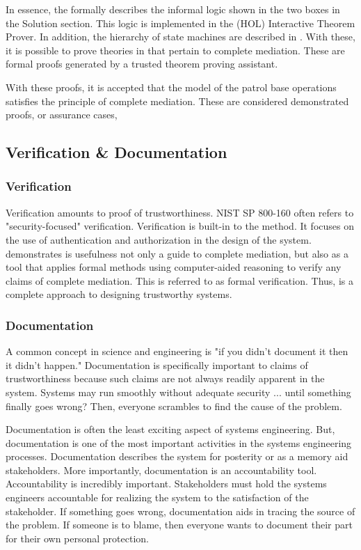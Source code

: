 \documentclass[../../main/main.tex]{subfiles}
\begin{document}
In essence, the  formally describes the informal logic shown in the two boxes in the Solution section.  This logic is implemented in the  (HOL) Interactive Theorem Prover.  In addition, the hierarchy of state machines are described in .  With these, it is possible to prove theories in  that pertain to complete mediation.  These are formal proofs generated by a trusted theorem proving assistant.  

With these proofs, it is accepted that the model of the patrol base operations satisfies the principle of complete mediation.  These are considered demonstrated proofs, or assurance cases, 

\subsection{Verification \& Documentation}\label{sssec:sseframework}
\subsubsection{Verification}
Verification amounts to proof of trustworthiness.  NIST SP 800-160 often refers to "security-focused" verification.  Verification is built-in to the  method.  It focuses on the use of authentication and authorization in the design of the system.   demonstrates is usefulness not only a guide to complete mediation, but also as a tool that applies formal methods using computer-aided reasoning to verify any claims of complete mediation. This is referred to as formal verification. Thus,  is a complete approach to designing trustworthy systems.

\subsubsection{Documentation}
A common concept in science and engineering is "if you didn't document it then it didn't happen."  Documentation is specifically important to claims of trustworthiness because such claims are not always readily apparent in the system. Systems may run smoothly without adequate security ... until something finally goes wrong?  Then, everyone scrambles to find the cause of the problem.

Documentation is often the least exciting aspect of systems engineering. But, documentation is one of the most important activities in the systems engineering processes.  Documentation describes the system for posterity or as a memory aid stakeholders.  More importantly, documentation is an accountability tool.  Accountability is incredibly important.  Stakeholders must hold the systems engineers accountable for realizing the system to the satisfaction of the stakeholder.  If something goes wrong, documentation aids in tracing the source of the problem.  If someone is to blame, then everyone wants to document their part for their own personal protection.  
\end{document}
